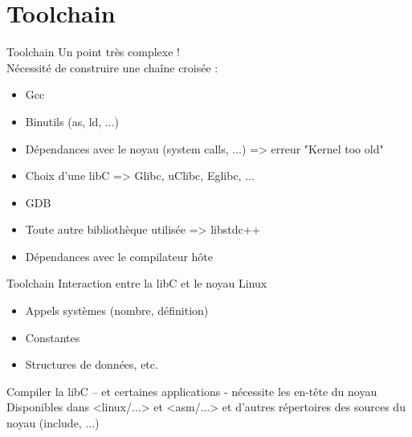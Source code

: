 \section{Toolchain}

\begin{frame}{Toolchain}{}
	Un point très complexe !\\
	Nécessité de construire une chaîne croisée :\\
	\begin{itemize}
		\item
			Gcc
		\item
			Binutils (as, ld, ...)
		\item
			Dépendances avec le noyau (system calls, ...) => erreur "Kernel too old"
		\item
			Choix d'une libC => Glibc, uClibc, Eglibc, ...
		\item
			GDB
		\item
			Toute autre bibliothèque utilisée => libstdc++
		\item
			Dépendances avec le compilateur hôte
	\end{itemize}		
\end{frame}

\begin{frame}{Toolchain}{}
	Interaction entre la libC et le noyau Linux
	\begin{itemize}
		\item
			Appels systèmes (nombre, définition)
		\item
			Constantes 
		\item
			Structures de données, etc.
	\end{itemize}
	Compiler la libC – et certaines applications - nécessite les en-tête du noyau\\
	Disponibles dans <linux/...> et <asm/...> et d'autres répertoires des sources du noyau (include, ...)\\
\end{frame}

